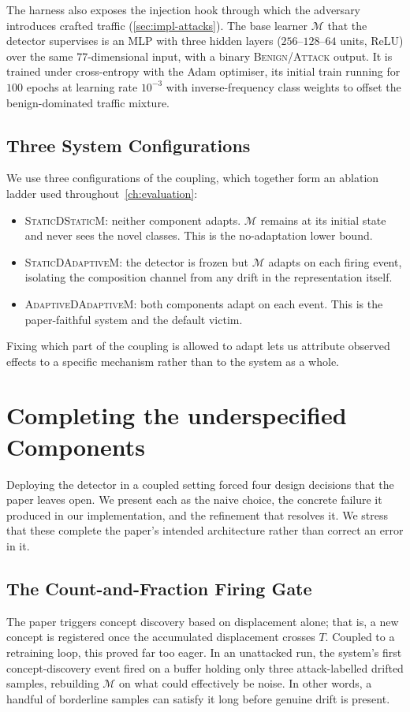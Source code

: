 The harness also exposes the injection hook through which the adversary introduces crafted traffic (\cref{sec:impl-attacks}). The base learner $\mathcal{M}$ that the detector supervises is an MLP with three hidden layers ($256$--$128$--$64$ units, ReLU) over the same $77$-dimensional input, with a binary \textsc{Benign}/\textsc{Attack} output. It is trained under cross-entropy with the Adam optimiser, its initial train running for $100$ epochs at learning rate $10^{-3}$ with inverse-frequency class weights to offset the benign-dominated traffic mixture.

\subsection{Three System Configurations}
\label{sec:impl-configs}
We use three configurations of the coupling, which together form an ablation ladder used throughout~\cref{ch:evaluation}:
\begin{itemize}
    \item \textsc{StaticDStaticM}: neither component adapts. $\mathcal{M}$ remains at its initial state and never sees the novel classes. This is the no-adaptation lower bound.
    \item \textsc{StaticDAdaptiveM}: the detector is frozen but $\mathcal{M}$ adapts on each firing event, isolating the composition channel from any drift in the representation itself.
    \item \textsc{AdaptiveDAdaptiveM}: both components adapt on each event. This is the paper-faithful system and the default victim.
\end{itemize}
Fixing which part of the coupling is allowed to adapt lets us attribute observed effects to a specific mechanism rather than to the system as a whole.

\section{Completing the underspecified Components}
\label{sec:impl-refinements}
Deploying the detector in a coupled setting forced four design decisions that the paper leaves open. We present each as the naive choice, the concrete failure it produced in our implementation, and the refinement that resolves it. We stress that these complete the paper's intended architecture rather than correct an error in it.

\subsection{The Count-and-Fraction Firing Gate}
\label{sec:impl-gate}
The paper triggers concept discovery based on displacement alone; that is, a new concept is registered once the accumulated displacement crosses $T$. Coupled to a retraining loop, this proved far too eager. In an unattacked run, the system's first concept-discovery event fired on a buffer holding only three attack-labelled drifted samples, rebuilding $\mathcal{M}$ on what could effectively be noise. In other words, a handful of borderline samples can satisfy it long before genuine drift is present.


